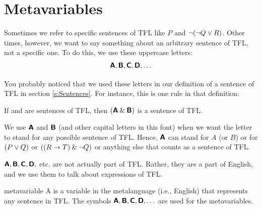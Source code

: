 \section{Metavariables}\label{s:Metavariables}

Sometimes we refer to specific sentences of TFL like $P$ and ${\neg} ({\neg} Q \vee R)$. Other times, however, we want to say something about an arbitrary sentence of TFL, not a specific one. To do this, we use these uppercase letters:
\vspace{-2mm}
	$$\bm{\mathsf{A}}, \bm{\mathsf{B}}, \bm{\mathsf{C}}, \bm{\mathsf{D}}, \ldots$$
	
You probably noticed that we used these letters in our definition of a sentence of TFL in section \ref{s:Sentences}. For instance, this is one rule in that definition:
\begin{earg}
\item[3.] If  and  are sentences of TFL, then $(\bm{\mathsf{A}}\mathbin{\&}\bm{\mathsf{B}})$ is a sentence of TFL.
\end{earg}
We use $\bm{\mathsf{A}}$ and $\bm{\mathsf{B}}$ (and other capital letters in this font) when we want the letter to stand for any possible sentence of TFL. Hence, $\bm{\mathsf{A}}$ can stand for $A$ (or $B$) or for $(P \vee Q)$ or $((R \rightarrow T) \mathbin{\&} {\neg} Q)$ or anything else that counts as a sentence of TFL. 

$\bm{\mathsf{A}}, \bm{\mathsf{B}}, \bm{\mathsf{C}}, \bm{\mathsf{D}},$ etc. are not actually part of TFL. Rather, they are a part of  English, and we use them to talk about expressions of TFL. 
	
\begin{factboxy}{metavariable}
A  is a variable in the metalanguage (i.e., English) that represents any sentence in TFL. The symbols $\bm{\mathsf{A}}, \bm{\mathsf{B}}, \bm{\mathsf{C}}, \bm{\mathsf{D}}, \ldots$ are used for the metavariables.
\end{factboxy}

